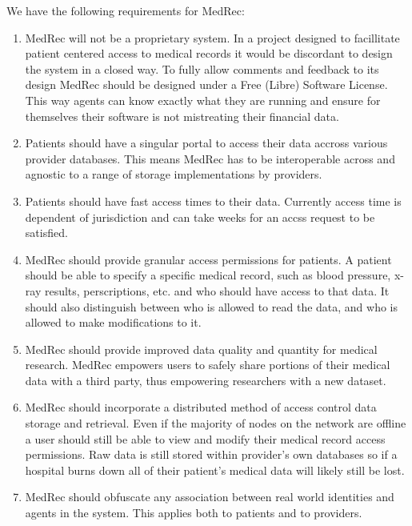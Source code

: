 \documentclass[a4paper]{article}
\begin{document}
We have the following requirements for MedRec:

\begin{enumerate}

\item MedRec will not be a proprietary system. In a project designed to facillitate patient centered access to medical records it would be discordant to design the system in a closed way. To fully allow comments and feedback to its design MedRec should be designed under a Free (Libre) Software License. This way agents can know exactly what they are running and ensure for themselves their software is not mistreating their financial data.

\item Patients should have a singular portal to access their data accross various provider databases. This means MedRec has to be interoperable across and agnostic to a range of storage implementations by providers.

\item Patients should have fast access times to their data. Currently access time is dependent of jurisdiction and can take weeks for an accss request to be satisfied.

\item MedRec should provide granular access permissions for patients. A patient should be able to specify a specific medical record, such as blood pressure, x-ray results, perscriptions, etc. and who should have access to that data. It should also distinguish between who is allowed to read the data, and who is allowed to make modifications to it.

\item MedRec should provide improved data quality and quantity for medical research. MedRec empowers users to safely share portions of their medical data with a third party, thus empowering researchers with a new dataset.

\item MedRec should incorporate a distributed method of access control data storage and retrieval. Even if the majority of nodes on the network are offline a user should still be able to view and modify their medical record access permissions. Raw data is still stored within provider's own databases so if a hospital burns down all of their patient's medical data will likely still be lost.

\item MedRec should obfuscate any association between real world identities and agents in the system. This applies both to patients and to providers.


\end{enumerate}
\end{document}
